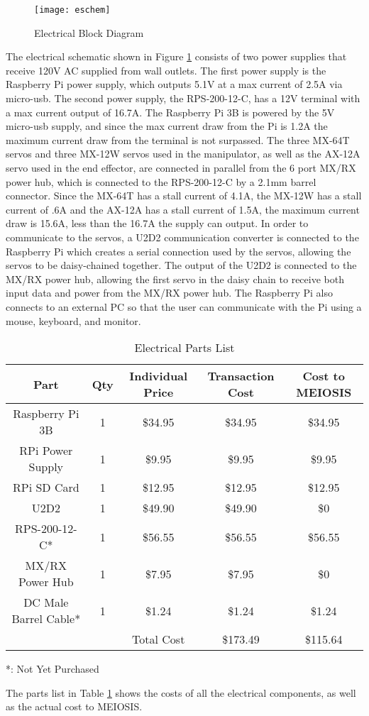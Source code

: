 \begin{figure}[htp]
  \centering
  \texttt{[image: eschem]}
  \caption{Electrical Block Diagram}
  \label{fig:ElectricalBlockDiagram}
\end{figure}
The electrical schematic shown in Figure \ref{fig:ElectricalBlockDiagram} consists of two power supplies that receive 120V AC supplied from wall outlets. The first power supply is the Raspberry Pi power supply, which outputs 5.1V at a max current of 2.5A via micro-usb. The second power supply, the RPS-200-12-C, has a 12V terminal with a max current output of 16.7A. The Raspberry Pi 3B is powered by the 5V micro-usb supply, and since the max current draw from the Pi is 1.2A the maximum current draw from the terminal is not surpassed. The three MX-64T servos and three MX-12W servos used in the manipulator, as well as the AX-12A servo used in the end effector, are connected in parallel from the 6 port MX/RX power hub, which is connected to the RPS-200-12-C by a 2.1mm barrel connector. Since the MX-64T has a stall current of 4.1A, the MX-12W has a stall current of .6A and the AX-12A has a stall current of 1.5A, the maximum current draw is 15.6A, less than the 16.7A the supply can output. In order to communicate to the servos, a U2D2 communication converter is connected to the Raspberry Pi which creates a serial connection used by the servos, allowing the servos to be daisy-chained together. The output of the U2D2 is connected to the MX/RX power hub, allowing the first servo in the daisy chain to receive both input data and power from the MX/RX power hub. The Raspberry Pi also connects to an external PC so that the user can communicate with the Pi using a mouse, keyboard, and monitor.

\begin{table}[htp]
  \center
  \caption{ Electrical Parts List}
  \label{tab:ElectricalPartsList}
  \begin{tabular}{c|c|c|c|c}
  Part & Qty & Individual Price & Transaction Cost & Cost to MEIOSIS \\\hline
  Raspberry Pi 3B & 1 & \$34.95 & \$34.95 & \$34.95 \\
  RPi Power Supply & 1 & \$9.95 & \$9.95 & \$9.95 \\
  RPi SD Card & 1 & \$12.95 & \$12.95 & \$12.95 \\
  U2D2 & 1 & \$49.90 & \$49.90 & \$0 \\
  RPS-200-12-C* & 1 & \$56.55 & \$56.55 & \$56.55 \\
  MX/RX Power Hub & 1 & \$7.95 & \$7.95 & \$0 \\
  DC Male Barrel Cable* & 1 & \$1.24 & \$1.24 & \$1.24 \\
  & & Total Cost & \$173.49 & \$115.64 \\
  \end{tabular}
  \small{*: Not Yet Purchased}
\end{table}

The parts list in Table \ref{tab:ElectricalPartsList} shows the costs of all the electrical components, as well as the actual cost to MEIOSIS.
